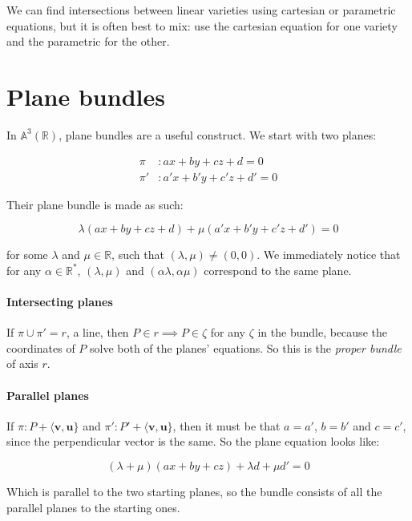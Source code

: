 \documentclass[12pt,a4paper]{report}
\numberwithin{equation}{section}
\theoremstyle{definition}
\theoremstyle{remark}
\begin{document}
We can find intersections between linear varieties using cartesian or parametric equations, but it is often best to mix: use the cartesian equation for one variety and the parametric for the other.

\section{Plane bundles}

In $\mathbb{A}^3 (\mathbb{R})$, plane bundles are a useful construct. We start with two planes:

\begin{align}
\pi &: ax + by + cz + d=0\\
\pi ' &: a'x+b'y+c'z+d'=0
\end{align}

Their plane bundle is made as such:

\begin{equation}
\lambda (ax + by + cz + d ) + \mu (a'x+b'y+c'z+d')=0
\end{equation}

for some $\lambda$ and $\mu \in \mathbb{R}$, such that $(\lambda, \mu) \neq (0, 0)$.
We immediately notice that for any $\alpha \in \mathbb{R}^*$, $(\lambda, \mu)$ and $(\alpha \lambda, \alpha \mu)$ correspond to the same plane.

\paragraph{Intersecting planes} If $\pi \cup \pi' = r$, a line, then $P \in r \implies P \in \zeta$ for any $\zeta$ in the bundle, because the coordinates of $P$ solve both of the planes' equations. So this is the \emph{proper bundle} of axis $r$.

\paragraph{Parallel planes} If $\pi: P + \langle \mathbf{v}, \mathbf{u}\rbrace$ and $\pi': P' + \langle \mathbf{v}, \mathbf{u}\rbrace$, then it must be that $a = a'$, $b=b'$ and  $c=c'$, since the perpendicular vector is the same. So the plane equation looks like:

\begin{equation}
(\lambda + \mu ) (ax + by+ cz) + \lambda d + \mu d'=0
\end{equation}

Which is parallel to the two starting planes, so the bundle consists of all the parallel planes to the starting ones.
\end{document}
